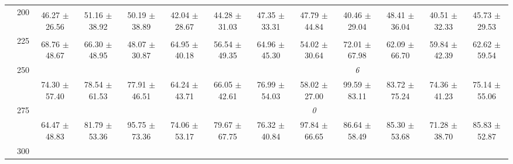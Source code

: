 \begin{table}[h]
{\begin{tabular}{
        ccccccccccccc}
 & \multirow{2}{*}{200}& & & & & & & & & & &  \\ 
 & & 46.27 $\pm$ 26.56& 51.16 $\pm$ 38.92& 50.19 $\pm$ 38.89& 42.04 $\pm$ 28.67& 44.28 $\pm$ 31.03& 47.35 $\pm$ 33.31& 47.79 $\pm$ 44.84& 40.46 $\pm$ 29.04& 48.41 $\pm$ 36.04& 40.51 $\pm$ 32.33& 45.73 $\pm$ 29.53 \\ 
 & \multirow{2}{*}{225}& \cellcolor[HTML]{EFEFEF} & \cellcolor[HTML]{EFEFEF} & \cellcolor[HTML]{EFEFEF} & \cellcolor[HTML]{EFEFEF} & \cellcolor[HTML]{EFEFEF} & \cellcolor[HTML]{EFEFEF} & \cellcolor[HTML]{EFEFEF} & \cellcolor[HTML]{EFEFEF} & \cellcolor[HTML]{EFEFEF} & \cellcolor[HTML]{EFEFEF} & \cellcolor[HTML]{EFEFEF}  \\ 
 & & \cellcolor[HTML]{EFEFEF} 68.76 $\pm$ 48.67& \cellcolor[HTML]{EFEFEF} 66.30 $\pm$ 48.95& \cellcolor[HTML]{EFEFEF} 48.07 $\pm$ 30.87& \cellcolor[HTML]{EFEFEF} 64.95 $\pm$ 40.18& \cellcolor[HTML]{EFEFEF} 56.54 $\pm$ 49.35& \cellcolor[HTML]{EFEFEF} 64.96 $\pm$ 45.30& \cellcolor[HTML]{EFEFEF} 54.02 $\pm$ 30.64& \cellcolor[HTML]{EFEFEF} 72.01 $\pm$ 67.98& \cellcolor[HTML]{EFEFEF} 62.09 $\pm$ 66.70& \cellcolor[HTML]{EFEFEF} 59.84 $\pm$ 42.39& \cellcolor[HTML]{EFEFEF} 62.62 $\pm$ 59.54 \\ 
 & \multirow{2}{*}{250}& & & & & & & & \textit{ 6 }& & &  \\ 
 & & 74.30 $\pm$ 57.40& 78.54 $\pm$ 61.53& 77.91 $\pm$ 46.51& 64.24 $\pm$ 43.71& 66.05 $\pm$ 42.61& 76.99 $\pm$ 54.03& 58.02 $\pm$ 27.00& 99.59 $\pm$ 83.11& 83.72 $\pm$ 75.24& 74.36 $\pm$ 41.23& 75.14 $\pm$ 55.06 \\ 
 & \multirow{2}{*}{275}& \cellcolor[HTML]{EFEFEF} & \cellcolor[HTML]{EFEFEF} & \cellcolor[HTML]{EFEFEF} & \cellcolor[HTML]{EFEFEF} & \cellcolor[HTML]{EFEFEF} & \cellcolor[HTML]{EFEFEF} & \cellcolor[HTML]{EFEFEF} \textit{ 0 }& \cellcolor[HTML]{EFEFEF} & \cellcolor[HTML]{EFEFEF} & \cellcolor[HTML]{EFEFEF} & \cellcolor[HTML]{EFEFEF}  \\ 
 & & \cellcolor[HTML]{EFEFEF} 64.47 $\pm$ 48.83& \cellcolor[HTML]{EFEFEF} 81.79 $\pm$ 53.36& \cellcolor[HTML]{EFEFEF} 95.75 $\pm$ 73.36& \cellcolor[HTML]{EFEFEF} 74.06 $\pm$ 53.17& \cellcolor[HTML]{EFEFEF} 79.67 $\pm$ 67.75& \cellcolor[HTML]{EFEFEF} 76.32 $\pm$ 40.84& \cellcolor[HTML]{EFEFEF} 97.84 $\pm$ 66.65& \cellcolor[HTML]{EFEFEF} 86.64 $\pm$ 58.49& \cellcolor[HTML]{EFEFEF} 85.30 $\pm$ 53.68& \cellcolor[HTML]{EFEFEF} 71.28 $\pm$ 38.70& \cellcolor[HTML]{EFEFEF} 85.83 $\pm$ 52.87 \\ 
 & \multirow{2}{*}{300}& & & & & & & & & & &  \\ 

\end{tabular}}
\end{table}

